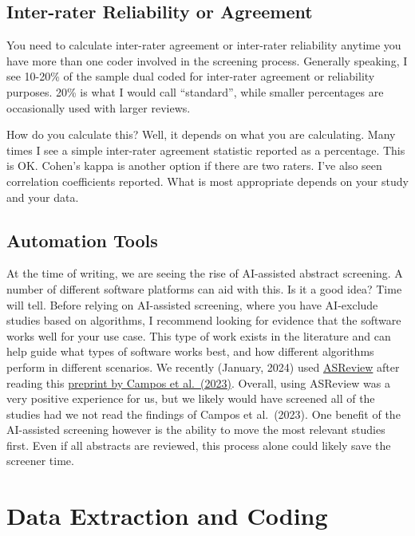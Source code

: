\documentclass[
]{book}
\begin{document}
\hypertarget{inter-rater-reliability-or-agreement}{%
\section{Inter-rater Reliability or Agreement}\label{inter-rater-reliability-or-agreement}}

You need to calculate inter-rater agreement or inter-rater reliability anytime you have more than one coder involved in the screening process. Generally speaking, I see 10-20\% of the sample dual coded for inter-rater agreement or reliability purposes. 20\% is what I would call ``standard'', while smaller percentages are occasionally used with larger reviews.

How do you calculate this? Well, it depends on what you are calculating. Many times I see a simple inter-rater agreement statistic reported as a percentage. This is OK. Cohen's kappa is another option if there are two raters. I've also seen correlation coefficients reported. What is most appropriate depends on your study and your data.

\hypertarget{automation-tools}{%
\section{Automation Tools}\label{automation-tools}}

At the time of writing, we are seeing the rise of AI-assisted abstract screening. A number of different software platforms can aid with this. Is it a good idea? Time will tell. Before relying on AI-assisted screening, where you have AI-exclude studies based on algorithms, I recommend looking for evidence that the software works well for your use case. This type of work exists in the literature and can help guide what types of software works best, and how different algorithms perform in different scenarios. We recently (January, 2024) used \href{https://asreview.nl/}{ASReview} after reading this \href{https://osf.io/preprints/psyarxiv/fpwc2/download}{preprint by Campos et al.~(2023)}\citep{campos2023}. Overall, using ASReview was a very positive experience for us, but we likely would have screened all of the studies had we not read the findings of Campos et al.~(2023)\citep{campos2023}. One benefit of the AI-assisted screening however is the ability to move the most relevant studies first. Even if all abstracts are reviewed, this process alone could likely save the screener time.

\hypertarget{data}{%
\chapter{Data Extraction and Coding}\label{data}}
\end{document}
